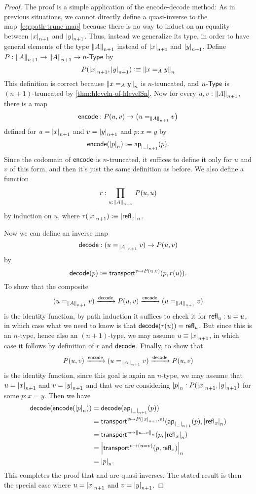 \begin{proof}
  The proof is a simple application of the encode-decode method: 
  As in previous situations, we cannot directly define a quasi-inverse to the map~\eqref{eq:path-trunc-map} because there is no way to induct on an
equality between $\tproj {n+1}x$ and $\tproj {n+1}y$.
  Thus, instead we generalize its type, in order to have general elements of the type $\trunc{n+1}A$ instead of $\tproj {n+1}x$ and $\tproj
{n+1}y$.
  Define $P:\trunc {n+1}A\to\trunc {n+1}A\to\typele{n}$ by
  \[P(\tproj {n+1}x,\tproj {n+1}y)\defeq \trunc n{x=_Ay}\]
  This definition is correct because $\trunc n{x=_Ay}$ is $n$-truncated, and $\typele{n}$ is $(n+1)$-truncated by
\autoref{thm:hleveln-of-hlevelSn}.
  Now for every $u,v:\trunc{n+1}A$, there is a map
  \[\encode:P(u,v) \to \big(u=_{\trunc{n+1}A}v\big)\]
  defined for $u=\tproj {n+1}x$ and $v=\tproj {n+1}y$ and $p:x=y$ by
  \[\encode(\tproj n{p})\defeq \apfunc{\tproj{n+1}\nameless} (p).\]
  Since the codomain of $\encode$ is $n$-truncated, it suffices to define it only for $u$ and $v$ of this form, and then it's just the same
definition as before.
  We also define a function
  \[ r : \prd{u:\trunc{n+1} A} P(u,u) \]
  by induction on $u$, where $r(\tproj{n+1} x) \defeq \tproj n {\refl x}$.

  Now we can define an inverse map
  \[\decode: (u=_{\trunc{n+1}A}v) \to P(u,v)\]
  by
  \[\decode(p) \defeq \transfib{v\mapsto P(u,v)}{p}{r(u)}. \]
  To show that the composite
  \[ (u=_{\trunc{n+1}A}v) \xrightarrow{\decode} P(u,v) \xrightarrow{\encode} (u=_{\trunc{n+1}A}v) \]
  is the identity function, by path induction it suffices to check it for $\refl u : u=u$, in which case what we need to know is that
$\decode(r(u)) = \refl{u}$.
  But since this is an $n$-type, hence also an $(n+1)$-type, we may assume $u\jdeq \tproj {n+1} x$, in which case it follows by definition
of $r$ and $\decode$.
  Finally, to show that 
  \[ P(u,v) \xrightarrow{\encode} (u=_{\trunc{n+1}A}v) \xrightarrow{\decode} P(u,v) \]
  is the identity function, since this goal is again an $n$-type, we may assume that $u=\tproj {n+1}x$ and $v=\tproj {n+1}y$ and that we are
considering $\tproj n p:P(\tproj{n+1}x,\tproj{n+1}y)$ for some $p:x=y$.
  Then we have
  \begin{align*}
    \decode(\encode(\tproj n p)) &= \decode(\apfunc{\tproj{n+1}\nameless}(p))\\
    &= \transfib{v\mapsto P(\tproj{n+1}x,v)}{\apfunc{\tproj{n+1}\nameless}(p)}{\tproj n {\refl x}}\\
    &= \transfib{v\mapsto \trunc n{u=v}}{p}{\tproj n {\refl x}}\\
    &= \tproj n {\transfib{v \mapsto (u=v)}{p}{\refl x}}\\
    &= \tproj n p.
  \end{align*}
  This completes the proof that \encode and \decode are quasi-inverses.
  The stated result is then the special case where $u=\tproj {n+1}x$ and $v=\tproj {n+1}y$.
\end{proof}

